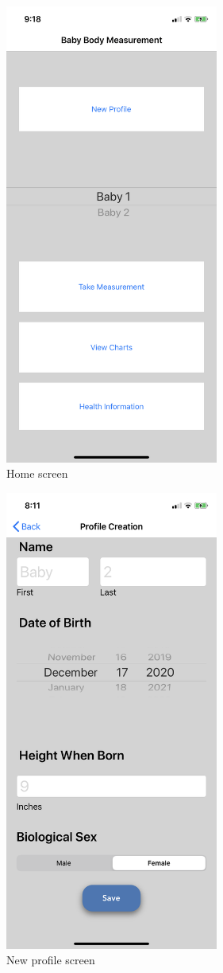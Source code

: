 \documentclass[onecolumn, draftclsnofoot,10pt, compsoc]{IEEEtran}
\begin{document}
\begin{figure}[h!]
\centering
\includegraphics[width=70mm]{./images/home-screen.png}
\caption{Home screen}
\end{figure}

\begin{figure}[h!]
\centering
\includegraphics[width=70mm]{./images/new-profile-screen.png}
\caption{New profile screen}
\end{figure}
\end{document}
